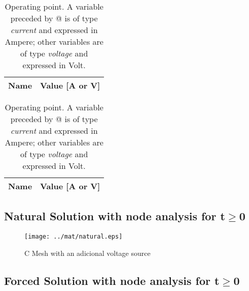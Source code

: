 \begin{table}[H]
  \centering
  \begin{tabular}{|l|r|}
    \hline    
    {\bf Name} & {\bf Value [A or V]} \\ \hline
    
  \end{tabular}
  \caption{Operating point. A variable preceded by @ is of type {\em current}
    and expressed in Ampere; other variables are of type {\it voltage} and expressed in
    Volt.}
  \label{tab:mat2a}
\end{table}

\begin{table}[H]
  \centering
  \begin{tabular}{|l|r|}
    \hline    
    {\bf Name} & {\bf Value [A or V]} \\ \hline
    
  \end{tabular}
  \caption{Operating point. A variable preceded by @ is of type {\em current}
    and expressed in Ampere; other variables are of type {\it voltage} and expressed in
    Volt.}
  \label{tab:mat2b}
\end{table}

\subsection{Natural Solution with node analysis for t$\geq$0}

\begin{figure}[H] \centering
\texttt{[image: ../mat/natural.eps]}
\caption{C Mesh with an adicional voltage source} %
\label{fig:mat3}
\end{figure}

\subsection{Forced Solution with node analysis for t$\geq$0}

